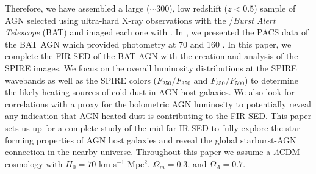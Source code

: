 Therefore, we have assembled a large ($\sim300$), low redshift ($z<0.5$) sample of AGN selected using ultra-hard X-ray observations with the \swift/\textit{Burst Alert Telescope} (BAT) and imaged each one with \herschel. In \citet{Melendez:2014yu}, we presented the PACS data of the BAT AGN which provided photometry at 70 and 160 \micron. In this paper, we complete the FIR SED of the BAT AGN with the creation and analysis of the SPIRE images. We focus on the overall luminosity distributions at the SPIRE wavebands as well as the SPIRE colors ($F_{250}/F_{350}$ and $F_{350}/F_{500}$) to determine the likely heating sources of cold dust in AGN host galaxies. We also look for correlations with a proxy for the bolometric AGN luminosity to potentially reveal any indication that AGN heated dust is contributing to the FIR SED. This paper sets us up for a complete study of the mid-far IR SED to fully explore the star-forming properties of AGN host galaxies and reveal the global starburst-AGN connection in the nearby universe. Throughout this paper we assume a $\Lambda$CDM cosmology with $H_0=70$ km s$^{-1}$ Mpc$^{2}$, $\Omega_{m} = 0.3$, and $\Omega_{\Lambda}=0.7$. 